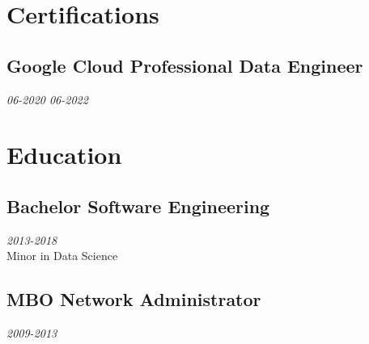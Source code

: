 \documentclass{article}
\begin{document}
\clearpage

\section{Certifications}
\subsection{Google Cloud Professional Data Engineer}\hfill {\em 06-2020 06-2022} \\


\section{Education}
\subsection{Bachelor Software Engineering}\hfill {\em 2013-2018} \\
Minor in Data Science
\subsection{MBO Network Administrator}\hfill {\em 2009-2013} \\
\end{document}
